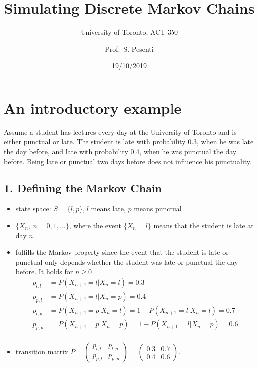 \documentclass[]{article}
\title{Simulating Discrete Markov Chains}
\subtitle{University of Toronto, ACT 350}
\author{Prof.~S. Pesenti}
\date{19/10/2019}
\begin{document}
\maketitle

\hypertarget{an-introductory-example}{%
\section{An introductory example}\label{an-introductory-example}}

Assume a student has lectures every day at the University of Toronto and
is either punctual or late. The student is late with probability
\(0.3\), when he was late the day before, and late with probability
\(0.4\), when he was punctual the day before. Being late or punctual two
days before does not influence his punctuality.

\hypertarget{defining-the-markov-chain}{%
\subsection{1. Defining the Markov
Chain}\label{defining-the-markov-chain}}

\begin{itemize}
\item
  state space: \(S = \{l, p\}\), \(l\) means late, \(p\) means
  punctual\\
\item
  \(\{X_n, ~ n = 0, 1, \ldots \}\), where the event \(\{X_n = l\}\)
  means that the student is late at day \(n\).\\
\item
  fulfills the Markov property since the event that the student is late
  or punctual only depends whether the student was late or punctual the
  day before. It holds for \(n \geq 0\) \begin{align*}
  p_{l,l} &= P(X_{n+1} = l | X_n = l) = 0.3\\
  p_{p,l} &= P(X_{n+1} = l | X_n = p) = 0.4\\
  p_{l,p} &= P(X_{n+1} = p | X_n = l) = 1 - P(X_{n+1} = l | X_n = l) = 0.7\\
  p_{p,p} &= P(X_{n+1} = p | X_n = p) = 1 - P(X_{n+1} = l | X_n = p) = 0.6\\
  \end{align*}
\item
  transition matrix
  \(P = \begin{pmatrix}  p_{l,l} & p_{l,p}\\  p_{p,l} & p_{p,p}  \end{pmatrix}  = \begin{pmatrix}  0.3 & 0.7\\  0.4 & 0.6  \end{pmatrix}\).
\end{itemize}
\end{document}
